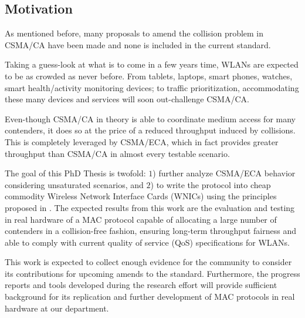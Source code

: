 \subsection{Motivation}\label{motivation}
As mentioned before, many proposals to amend the collision problem in CSMA/CA have been made and none is included in the current standard.

Taking a guess-look at what is to come in a few years time, WLANs are expected to be as crowded as never before. From tablets, laptops, smart phones, watches, smart health/activity monitoring devices; to traffic prioritization, accommodating these many devices and services will soon out-challenge CSMA/CA.

Even-though CSMA/CA in theory is able to coordinate medium access for many contenders, it does so at the price of a reduced throughput induced by collisions. This is completely leveraged by CSMA/ECA, which in fact provides greater throughput than CSMA/CA in almost every testable scenario.

The goal of this PhD Thesis is twofold: $1$) further analyze CSMA/ECA behavior considering unsaturated scenarios, and $2$) to write the protocol into cheap commodity Wireless Network Interface Cards (WNICs) using the principles proposed in \cite{WMP}. The expected results from this work are the evaluation and testing in real hardware of a MAC protocol capable of allocating a large number of contenders in a collision-free fashion, ensuring long-term throughput fairness and able to comply with current quality of service (QoS) specifications for WLANs. 

This work is expected to collect enough evidence for the community to consider its contributions for upcoming amends to the standard. Furthermore, the progress reports and tools developed during the research effort will provide sufficient background for its replication and further development of MAC protocols in real hardware at our department.



